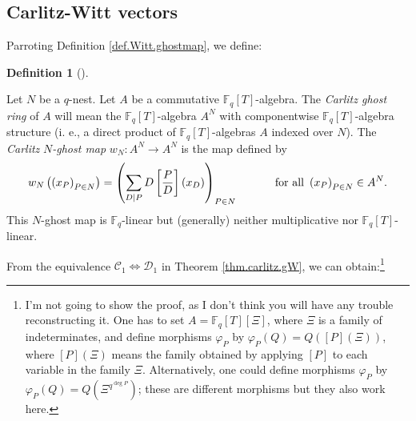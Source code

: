 \documentclass[numbers=enddot,12pt,final,onecolumn,notitlepage]{scrartcl}%
\theoremstyle{definition}
\newtheorem{defi}[theo]{Definition}
\newenvironment{definition}[1][]
{\begin{defi}[#1]\begin{leftbar}}
{\end{leftbar}\end{defi}}
\let\sumnonlimits\sum
\renewcommand{\sum}{\sumnonlimits\limits}
\begin{document}
\subsection{\label{subsect.carlitz-Witt}Carlitz-Witt vectors}

Parroting Definition \ref{def.Witt.ghostmap}, we define:

\begin{definition}
\label{def.carlitz.Witt.ghostmap}Let $N$ be a $q$-nest. Let $A$ be a
commutative $\mathbb{F}_{q}\left[  T\right]  $-algebra. The \textit{Carlitz
ghost ring} of $A$ will mean the $\mathbb{F}_{q}\left[  T\right]  $-algebra
$A^{N}$ with componentwise $\mathbb{F}_{q}\left[  T\right]  $-algebra
structure (i. e., a direct product of $\mathbb{F}_{q}\left[  T\right]
$-algebras $A$ indexed over $N$). The \textit{Carlitz }$N$\textit{-ghost map}
$w_{N}:A^{N}\rightarrow A^{N}$ is the map defined by%
\[
w_{N}\left(  \left(  x_{P}\right)  _{P\in N}\right)  =\left(  \sum
\limits_{D\mid P}D\left[  \dfrac{P}{D}\right]  \left(  x_{D}\right)  \right)
_{P\in N}\ \ \ \ \ \ \ \ \ \ \text{for all }\left(  x_{P}\right)  _{P\in N}\in
A^{N}.
\]
This $N$-ghost map is $\mathbb{F}_{q}$-linear but (generally) neither
multiplicative nor $\mathbb{F}_{q}\left[  T\right]  $-linear.
\end{definition}

From the equivalence $\mathcal{C}_{1}\Longleftrightarrow\mathcal{D}_{1}$ in
Theorem \ref{thm.carlitz.gW}, we can obtain:\footnote{I'm not going to show
the proof, as I don't think you will have any trouble reconstructing it. One
has to set $A=\mathbb{F}_{q}\left[  T\right]  \left[  \Xi\right]  $, where
$\Xi$ is a family of indeterminates, and define morphisms $\varphi_{P}$ by
$\varphi_{P}\left(  Q\right)  =Q\left(  \left[  P\right]  \left(  \Xi\right)
\right)  $, where $\left[  P\right]  \left(  \Xi\right)  $ means the family
obtained by applying $\left[  P\right]  $ to each variable in the family $\Xi
$. Alternatively, one could define morphisms $\varphi_{P}$ by $\varphi
_{P}\left(  Q\right)  =Q\left(  \Xi^{q^{\deg P}}\right)  $; these are
different morphisms but they also work here.}
\end{document}
